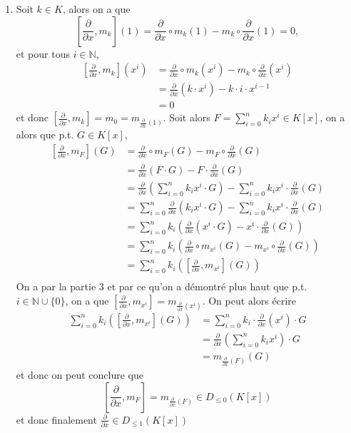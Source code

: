 \documentclass[french]{article}
\newcommand{\dx}{\frac{\partial}{\partial x}}
\newcommand{\ls}{\left[}
\newcommand{\rs}{\right]}
\newcommand{\N}{\mathbb{N}}
\begin{document}
\begin{enumerate}
	\item
		Soit $k \in K$, alors on a que
		\begin{equation*}
			\ls \dx, m_k \rs(1) = \dx \circ m_k (1) - m_k\circ\dx(1) = 0,
		\end{equation*}
		et pour tous $i \in \N$,
		\begin{align*}
			\ls \dx, m_k \rs(x^i) &= \dx \circ m_k (x^i)
			- m_k\circ\dx(x^i)\\
			&= \dx(k\cdot x^i) - k\cdot i\cdot x^{i - 1}\\
			&= 0
		\end{align*}
		et donc $\ls \dx, m_k \rs = m_0 = m_{\dx(1)}$.
		Soit alors $F = \sum_{i=0}^n k_ix^i \in K[x]$, on a alors que
		p.t. $G \in K[x]$,
		\begin{align*}
			\ls\dx, m_F\rs(G) &= \dx\circ m_F(G) - m_F \circ\dx(G)\\
			&= \dx(F\cdot G) - F\cdot \dx(G)\\
			&= \dx\left(\sum_{i=0}^n k_ix^i \cdot G\right)
			-  \sum_{i=0}^n k_ix^i \cdot \dx(G)\\
			&= \sum_{i=0}^n \dx\left(k_ix^i \cdot G\right)
			-  \sum_{i=0}^n k_ix^i \cdot \dx(G)\\
			&= \sum_{i=0}^n k_i \left(
			\dx(x^i \cdot G) - x^i \cdot \dx(G)\right)\\
			&= \sum_{i=0}^n k_i \left(
			\dx\circ m_{x^i}(G) - m_{x^i} \circ \dx(G)\right)\\
			&= \sum_{i=0}^n k_i \left(
			\ls \dx, m_{x^i}\rs(G)\right)\\
		\end{align*}
		On a par la partie $3$ et par ce qu'on a démontré plus haut que
		p.t. $i\in \N\cup\{0\}$, on a que 
		$\ls \dx, m_{x^i} \rs = m_{\dx(x^i)}$.
		On peut alors écrire 
		\begin{align*}
			\sum_{i=0}^n k_i \left(
			\ls \dx, m_{x^i}\rs(G)\right) &= 
			\sum_{i=0}^n k_i \cdot \dx(x^i) \cdot G\\
			&= \dx\left(\sum_{i=0}^nk_ix^i\right)\cdot G\\
			&= m_{\dx(F)}(G)
		\end{align*}
		et donc on peut conclure que 
		\begin{equation*}
			\ls \dx, m_F \rs = m_{\dx(F)} \in D_{\leq 0}(K[x])
		\end{equation*}
		et donc finalement $\dx \in D_{\leq 1} (K[x])$
\end{enumerate}
\end{document}
